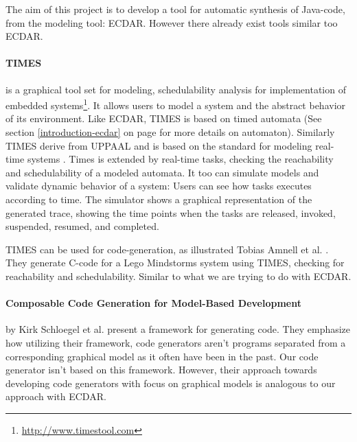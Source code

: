 The aim of this project is to develop a tool for automatic synthesis of
Java-code, from the modeling tool: ECDAR. However there already exist tools
similar too ECDAR.

\paragraph{TIMES} is a graphical tool set for modeling, schedulability analysis
for implementation of embedded
systems\footnote{\url{http://www.timestool.com}}. It allows users to model a
system and the abstract behavior of its environment. Like ECDAR, TIMES is based
on timed automata (See section \ref{introduction-ecdar} on
page \pageref{introduction-ecdar} for more details on automaton). Similarly
TIMES derive from UPPAAL and is based on the standard for modeling real-time
systems \cite{Alur1994:183}.  Times is extended by real-time tasks, checking the
reachability and schedulability of a modeled automata. It too can simulate
models and validate dynamic behavior of a system: Users can see how tasks
executes according to time. The simulator shows a graphical representation of
the generated trace, showing the time points when the tasks are released,
invoked, suspended, resumed, and completed.

TIMES can be used for code-generation, as illustrated Tobias Amnell et
al. \cite{Amnell:2002:CST:779110.779112}. They generate C-code for a Lego
Mindstorms system using TIMES, checking for reachability and
schedulability. Similar to what we are trying to do with ECDAR.


\paragraph{Composable Code Generation for Model-Based Development}
by Kirk Schloegel et al. present a framework for generating
code\cite{composable-code-generation}. They emphasize how utilizing their
framework, code generators aren't programs separated from a corresponding
graphical model as it often have been in the past. Our code generator isn't
based on this framework. However, their approach towards developing code generators
with focus on graphical models is analogous to our approach with ECDAR.

